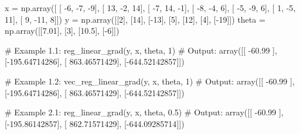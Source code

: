 \documentclass[]{article}
\newenvironment{Shaded}{\begin{snugshade}}{\end{snugshade}}
\newcommand{\CommentTok}[1]{\textcolor[rgb]{0.48,0.49,0.49}{#1}}
\newcommand{\DecValTok}[1]{\textcolor[rgb]{0.96,0.45,0.00}{#1}}
\newcommand{\FloatTok}[1]{\textcolor[rgb]{0.96,0.45,0.00}{#1}}
\newcommand{\NormalTok}[1]{\textcolor[rgb]{0.81,0.81,0.76}{#1}}
\newcommand{\OperatorTok}[1]{\textcolor[rgb]{0.81,0.81,0.76}{#1}}
\begin{document}
\begin{Shaded}
\begin{Highlighting}[]
\NormalTok{x }\OperatorTok{=}\NormalTok{ np.array([}
\NormalTok{      [ }\DecValTok{-6}\NormalTok{,  }\DecValTok{-7}\NormalTok{,  }\DecValTok{-9}\NormalTok{],}
\NormalTok{      [ }\DecValTok{13}\NormalTok{,  }\DecValTok{-2}\NormalTok{,  }\DecValTok{14}\NormalTok{],}
\NormalTok{      [ }\DecValTok{-7}\NormalTok{,  }\DecValTok{14}\NormalTok{,  }\DecValTok{-1}\NormalTok{],}
\NormalTok{      [ }\DecValTok{-8}\NormalTok{,  }\DecValTok{-4}\NormalTok{,   }\DecValTok{6}\NormalTok{],}
\NormalTok{      [ }\DecValTok{-5}\NormalTok{,  }\DecValTok{-9}\NormalTok{,   }\DecValTok{6}\NormalTok{],}
\NormalTok{      [  }\DecValTok{1}\NormalTok{,  }\DecValTok{-5}\NormalTok{,  }\DecValTok{11}\NormalTok{],}
\NormalTok{      [  }\DecValTok{9}\NormalTok{, }\DecValTok{-11}\NormalTok{,   }\DecValTok{8}\NormalTok{]])}
\NormalTok{y }\OperatorTok{=}\NormalTok{ np.array([[}\DecValTok{2}\NormalTok{], [}\DecValTok{14}\NormalTok{], [}\OperatorTok{-}\DecValTok{13}\NormalTok{], [}\DecValTok{5}\NormalTok{], [}\DecValTok{12}\NormalTok{], [}\DecValTok{4}\NormalTok{], [}\OperatorTok{-}\DecValTok{19}\NormalTok{]])}
\NormalTok{theta }\OperatorTok{=}\NormalTok{ np.array([[}\FloatTok{7.01}\NormalTok{], [}\DecValTok{3}\NormalTok{], [}\FloatTok{10.5}\NormalTok{], [}\OperatorTok{-}\DecValTok{6}\NormalTok{]])}

\CommentTok{# Example 1.1:}
\NormalTok{reg_linear_grad(y, x, theta, }\DecValTok{1}\NormalTok{)}
\CommentTok{# Output:}
\NormalTok{array([[ }\FloatTok{-60.99}\NormalTok{      ],}
\NormalTok{       [}\OperatorTok{-}\FloatTok{195.64714286}\NormalTok{],}
\NormalTok{       [ }\FloatTok{863.46571429}\NormalTok{],}
\NormalTok{       [}\OperatorTok{-}\FloatTok{644.52142857}\NormalTok{]])}

\CommentTok{# Example 1.2:}
\NormalTok{vec_reg_linear_grad(y, x, theta, }\DecValTok{1}\NormalTok{)}
\CommentTok{# Output:}
\NormalTok{array([[ }\FloatTok{-60.99}\NormalTok{      ],}
\NormalTok{       [}\OperatorTok{-}\FloatTok{195.64714286}\NormalTok{],}
\NormalTok{       [ }\FloatTok{863.46571429}\NormalTok{],}
\NormalTok{       [}\OperatorTok{-}\FloatTok{644.52142857}\NormalTok{]])}

\CommentTok{# Example 2.1:}
\NormalTok{reg_linear_grad(y, x, theta, }\FloatTok{0.5}\NormalTok{)}
\CommentTok{# Output:}
\NormalTok{array([[ }\FloatTok{-60.99}\NormalTok{      ],}
\NormalTok{       [}\OperatorTok{-}\FloatTok{195.86142857}\NormalTok{],}
\NormalTok{       [ }\FloatTok{862.71571429}\NormalTok{],}
\NormalTok{       [}\OperatorTok{-}\FloatTok{644.09285714}\NormalTok{]])}


\end{Highlighting}
\end{Shaded}
\end{document}
